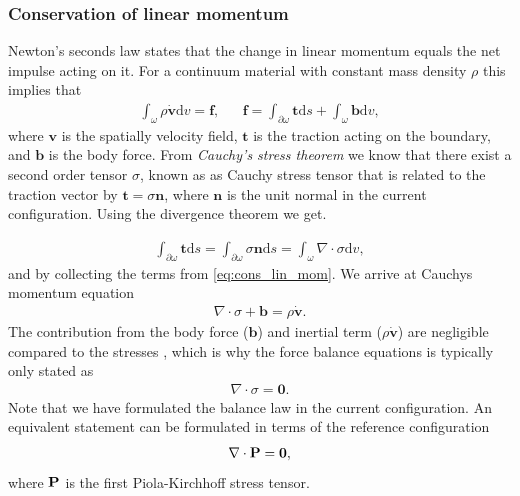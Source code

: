 \subsubsection{Conservation of linear momentum}
Newton's seconds law states that the change in linear momentum equals
the net impulse acting on it. For a continuum material with constant
mass density $\rho$ this implies that
\begin{align}
  \int_{\omega} \rho \dot{\mathbf{v}} \mathrm{d}v = \mathbf{f},
  && \mathbf{f} = \int_{\partial \omega} \mathbf{t} \mathrm{d}s
     + \int_{\omega} \mathbf{b} \mathrm{d}v,
     \label{eq:cons_lin_mom}
\end{align}
where $\mathbf{v}$ is the spatially velocity field, $\mathbf{t}$ is
the traction acting on the boundary, and $\mathbf{b}$ is the body
force. From \emph{Cauchy's stress theorem} we know that there exist a
second order tensor $\sigma$, known as as Cauchy stress tensor that is
related to the traction vector by $\mathbf{t} = \sigma \mathbf{n}$,
where $\mathbf{n}$ is the unit normal in the current configuration.
Using the divergence theorem we get.

\begin{align*}
  \int_{\partial \omega} \mathbf{t} \mathrm{d}s
  = \int_{\partial \omega} \sigma \mathbf{n} \mathrm{d}s
  = \int_{\omega} \nabla \cdot \sigma \mathrm{d}v,
\end{align*}
and by collecting the terms from \eqref{eq:cons_lin_mom}. We arrive at
Cauchys momentum equation
\begin{align}
  \nabla \cdot \sigma + \mathbf{b} =  \rho \dot{\mathbf{v}}.
  \label{eq:chauch_momentum_eq}
\end{align}
The contribution from the body force ($\mathbf{b}$)  and inertial term
($\rho \dot{\mathbf{v}}$) are negligible compared to the stresses
\cite{hunter1996kd,tallarida1970left, moskowitz1981effects}, which is
why the force balance equations is typically only stated as
\begin{align}
  \nabla \cdot \sigma = \mathbf{0}.
  \label{eq:momentum_simple_current}
\end{align}
Note that we have formulated the balance law in the current
configuration. An equivalent statement can be formulated in terms of
the reference configuration
\begin{align}
  \nabla \cdot \mathbf{P} = \mathbf{0}, 
  \label{eq:momentum_simple_reference}
\end{align}
where $\mathbf{P}$ is the first Piola-Kirchhoff stress tensor.

